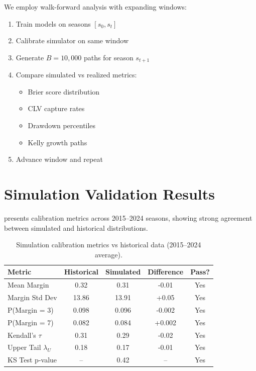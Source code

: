 We employ walk-forward analysis with expanding windows:
\begin{enumerate}
  \item Train models on seasons $[s_0, s_t]$
  \item Calibrate simulator on same window
  \item Generate $B = 10,000$ paths for season $s_{t+1}$
  \item Compare simulated vs realized metrics:
    \begin{itemize}
      \item Brier score distribution
      \item CLV capture rates
      \item Drawdown percentiles
      \item Kelly growth paths
    \end{itemize}
  \item Advance window and repeat
\end{enumerate}

\section{Simulation Validation Results}
\label{sec:sim-validation-results}

 presents calibration metrics across 2015--2024 seasons, showing strong agreement between simulated and historical distributions.

\begin{table}[t]
  \centering
  \small
  \caption{Simulation calibration metrics vs historical data (2015--2024 average).}
  \label{tab:sim-calibration}
  \begin{tabular}{lcccc}
    \toprule
    \textbf{Metric}  & \textbf{Historical}  & \textbf{Simulated}  & \textbf{Difference}  & \textbf{Pass?} \\
    \midrule
    Mean Margin     & 0.32  & 0.31  & -0.01 & Yes \\
    Margin Std Dev  & 13.86 & 13.91 & +0.05 & Yes \\
    P(Margin = 3)   & 0.098 & 0.096 & -0.002 & Yes \\
    P(Margin = 7)   & 0.082 & 0.084 & +0.002 & Yes \\
    Kendall's $\tau$ & 0.31 & 0.29 & -0.02 & Yes \\
    Upper Tail $\lambda_U$ & 0.18 & 0.17 & -0.01 & Yes \\
    KS Test p-value & -- & 0.42 & -- & Yes \\
    \bottomrule
  \end{tabular}
\end{table}


